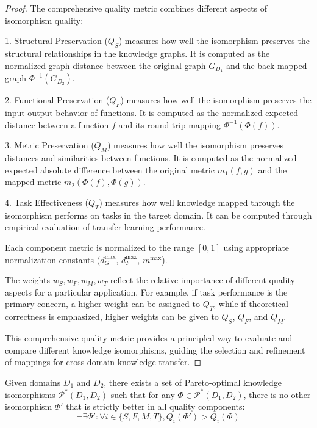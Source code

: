\begin{proof}
The comprehensive quality metric combines different aspects of isomorphism quality:

1. Structural Preservation ($Q_S$) measures how well the isomorphism preserves the structural relationships in the knowledge graphs. It is computed as the normalized graph distance between the original graph $G_{D_1}$ and the back-mapped graph $\Phi^{-1}(G_{D_2})$.

2. Functional Preservation ($Q_F$) measures how well the isomorphism preserves the input-output behavior of functions. It is computed as the normalized expected distance between a function $f$ and its round-trip mapping $\Phi^{-1}(\Phi(f))$.

3. Metric Preservation ($Q_M$) measures how well the isomorphism preserves distances and similarities between functions. It is computed as the normalized expected absolute difference between the original metric $m_1(f,g)$ and the mapped metric $m_2(\Phi(f),\Phi(g))$.

4. Task Effectiveness ($Q_T$) measures how well knowledge mapped through the isomorphism performs on tasks in the target domain. It can be computed through empirical evaluation of transfer learning performance.

Each component metric is normalized to the range $[0, 1]$ using appropriate normalization constants ($d_G^{\max}$, $d_F^{\max}$, $m^{\max}$).

The weights $w_S, w_F, w_M, w_T$ reflect the relative importance of different quality aspects for a particular application. For example, if task performance is the primary concern, a higher weight can be assigned to $Q_T$, while if theoretical correctness is emphasized, higher weights can be given to $Q_S$, $Q_F$, and $Q_M$.

This comprehensive quality metric provides a principled way to evaluate and compare different knowledge isomorphisms, guiding the selection and refinement of mappings for cross-domain knowledge transfer.
\end{proof}

\begin{theorem}
Given domains $D_1$ and $D_2$, there exists a set of Pareto-optimal knowledge isomorphisms $\mathcal{P}^*(D_1, D_2)$ such that for any $\Phi \in \mathcal{P}^*(D_1, D_2)$, there is no other isomorphism $\Phi'$ that is strictly better in all quality components:
\begin{equation}
\neg \exists \Phi' : \forall i \in \{S,F,M,T\}, Q_i(\Phi') > Q_i(\Phi)
\end{equation}
\end{theorem}

